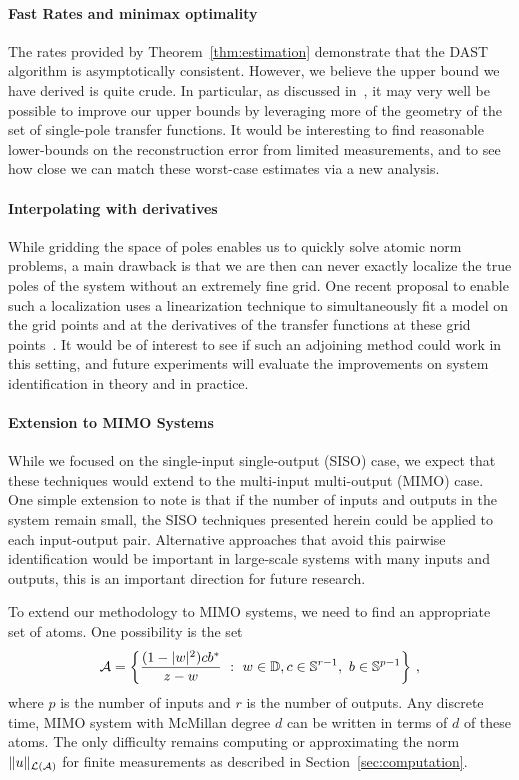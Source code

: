 \paragraph{Fast Rates and minimax optimality} The rates provided by
Theorem~\ref{thm:estimation} demonstrate that the DAST algorithm is
asymptotically consistent. However, we believe the upper bound we have derived
is quite crude. In particular, as discussed in~\cite{btr12}, it may
very well be possible to improve our upper bounds by leveraging more of the
geometry of the set of single-pole transfer functions. It would be interesting
to find reasonable lower-bounds on the reconstruction error from limited
measurements, and to see how close we can match these worst-case estimates via a
new analysis.

\paragraph{Interpolating with derivatives} While gridding the space of poles
enables us to quickly solve atomic norm problems, a main drawback is that we are
then can never exactly localize the true poles of the system without an
extremely fine grid. One recent proposal to enable such a localization uses a
linearization technique to simultaneously fit a model on the grid points and at
the derivatives of the transfer functions at these grid
points~\cite{Simoncelli11}. It would be of interest to see if such an adjoining
method could work in this setting, and future experiments will evaluate the
improvements on system identification in theory and in practice.

\paragraph{Extension to MIMO Systems} While we focused on the single-input
single-output (SISO) case, we expect that these techniques would
extend to the multi-input multi-output (MIMO) case. One simple extension to note
is that if the number of inputs and outputs in the system remain small, the SISO
techniques presented herein could be applied to each input-output pair.
Alternative approaches that avoid this pairwise identification would be
important in large-scale systems with many inputs and outputs, this is an
important direction for future research.

To extend our methodology to MIMO systems, we need to find an appropriate set of atoms. One possibility is the set
\[
\mathcal{A} = \left\{ \frac{(1-|w|^2) cb^* }{z-w} ~:~w\in \mathbb{D}, c\in\mathbb{S}^{r-1},\,\,b\in\mathbb{S}^{p-1} \right\}\,,
\]
where $p$ is the number of inputs and $r$ is the number of outputs.  Any discrete time, MIMO system with  McMillan degree $d$ can be written in terms of $d$ of these atoms.  The only difficulty remains computing or approximating the norm $\|u\|_{\mathcal{L}(\mathcal{A})}$ for finite measurements as described in Section~\ref{sec:computation}.

